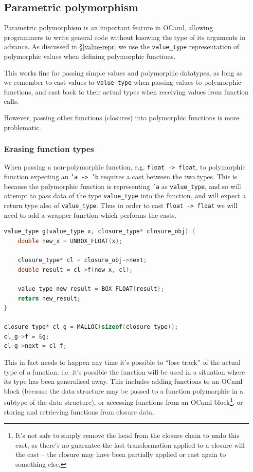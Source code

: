 \documentclass[12pt,a4paper,twoside,openright]{report}
\begin{document}
\subsection{Parametric polymorphism}

Parametric polymorphism is an important feature in OCaml, allowing programmers
to write general code without knowing the type of its arguments in advance. As
discussed in \S\ref{value-repr} we use the \verb|value_type| representation of
polymorphic values when defining polymorphic functions.

This works fine for passing simple values and polymorphic datatypes, as long as 
we remember to cast values to \verb|value_type| when passing values to 
polymorphic functions, and cast back to their actual types when receiving 
values from function calls.

However, passing other functions (closures) into polymorphic functions is more 
problematic.

\subsubsection{Erasing function types}

When passing a non-polymorphic function, e.g. \texttt{float -> float}, to
polymorphic function expecting an \texttt{'a -> 'b} requires a cast between the
two types. This is because the polymorphic function is representing \texttt{'a}
as \verb|value_type|, and so will attempt to pass data of the type
\verb|value_type| into the function, and will expect a return type also of
\verb|value_type|. Thus in order to cast \texttt{float -> float} we will need to
add a wrapper function which performs the casts.

\begin{lstlisting}[language=C]
value_type g(value_type x, closure_type* closure_obj) {
    double new_x = UNBOX_FLOAT(x);

    closure_type* cl = closure_obj->next;
    double result = cl->f(new_x, cl);
    
    value_type new_result = BOX_FLOAT(result);
    return new_result;
}

closure_type* cl_g = MALLOC(sizeof(closure_type));
cl_g->f = &g;
cl_g->next = cl_f;
\end{lstlisting}

This in fact needs to happen any time it's possible to ``lose track'' of the
actual type of a function, i.e. it's possible the function will be used in a
situation where its type has been generalised away. This includes adding
functions to an OCaml block (because the data structure may be passed to a
function polymorphic in a subtype of the data structure), or accessing functions
from an OCaml block\footnote{It's not safe to simply remove the head from the
    closure chain to undo this cast, as there's no guarantee the last
    transformation applied to a closure will the cast -- the closure may have
been partially applied or cast again to something else.}, or storing and
retrieving functions from closure data.
\end{document}
